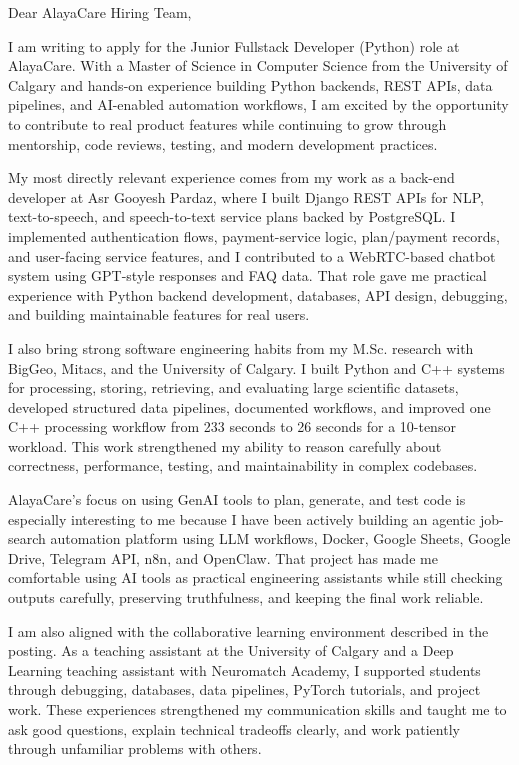 \documentclass[11pt]{letter}
\begin{document}
\begin{letter}{}

\opening{Dear AlayaCare Hiring Team,}

I am writing to apply for the Junior Fullstack Developer (Python) role at AlayaCare. With a Master of Science in Computer Science from the University of Calgary and hands-on experience building Python backends, REST APIs, data pipelines, and AI-enabled automation workflows, I am excited by the opportunity to contribute to real product features while continuing to grow through mentorship, code reviews, testing, and modern development practices.

My most directly relevant experience comes from my work as a back-end developer at Asr Gooyesh Pardaz, where I built Django REST APIs for NLP, text-to-speech, and speech-to-text service plans backed by PostgreSQL. I implemented authentication flows, payment-service logic, plan/payment records, and user-facing service features, and I contributed to a WebRTC-based chatbot system using GPT-style responses and FAQ data. That role gave me practical experience with Python backend development, databases, API design, debugging, and building maintainable features for real users.

I also bring strong software engineering habits from my M.Sc. research with BigGeo, Mitacs, and the University of Calgary. I built Python and C++ systems for processing, storing, retrieving, and evaluating large scientific datasets, developed structured data pipelines, documented workflows, and improved one C++ processing workflow from 233 seconds to 26 seconds for a 10-tensor workload. This work strengthened my ability to reason carefully about correctness, performance, testing, and maintainability in complex codebases.

AlayaCare's focus on using GenAI tools to plan, generate, and test code is especially interesting to me because I have been actively building an agentic job-search automation platform using LLM workflows, Docker, Google Sheets, Google Drive, Telegram API, n8n, and OpenClaw. That project has made me comfortable using AI tools as practical engineering assistants while still checking outputs carefully, preserving truthfulness, and keeping the final work reliable.

I am also aligned with the collaborative learning environment described in the posting. As a teaching assistant at the University of Calgary and a Deep Learning teaching assistant with Neuromatch Academy, I supported students through debugging, databases, data pipelines, PyTorch tutorials, and project work. These experiences strengthened my communication skills and taught me to ask good questions, explain technical tradeoffs clearly, and work patiently through unfamiliar problems with others.


\end{letter}
\end{document}
